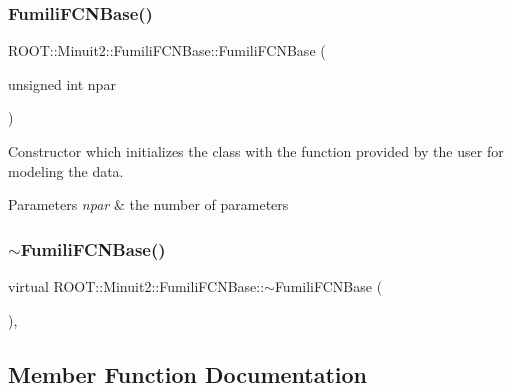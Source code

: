 \subsubsection{\texorpdfstring{FumiliFCNBase()}{FumiliFCNBase()}\hspace{0.1cm}{\footnotesize\ttfamily [4/4]}}
{\footnotesize\ttfamily R\+O\+O\+T\+::\+Minuit2\+::\+Fumili\+F\+C\+N\+Base\+::\+Fumili\+F\+C\+N\+Base (\begin{DoxyParamCaption}\item[{unsigned int}]{npar }\end{DoxyParamCaption})\hspace{0.3cm}{\ttfamily [inline]}}

Constructor which initializes the class with the function provided by the user for modeling the data.


\begin{DoxyParams}{Parameters}
{\em npar} & the number of parameters \\
\hline
\end{DoxyParams}
\mbox{\label{classROOT_1_1Minuit2_1_1FumiliFCNBase_a94961223a3baa0a131461be70a55a4e3}} 
\subsubsection{\texorpdfstring{$\sim$FumiliFCNBase()}{~FumiliFCNBase()}\hspace{0.1cm}{\footnotesize\ttfamily [2/2]}}
{\footnotesize\ttfamily virtual R\+O\+O\+T\+::\+Minuit2\+::\+Fumili\+F\+C\+N\+Base\+::$\sim$\+Fumili\+F\+C\+N\+Base (\begin{DoxyParamCaption}{ }\end{DoxyParamCaption})\hspace{0.3cm}{\ttfamily [inline]}, {\ttfamily [virtual]}}



\subsection{Member Function Documentation}
\mbox{\label{classROOT_1_1Minuit2_1_1FumiliFCNBase_ab8056ffdfd619915e22f1310db0644a6}} 

